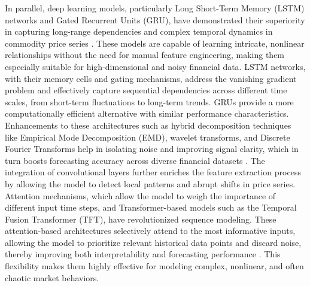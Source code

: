 \documentclass[12pt]{elsarticle}
\begin{document}
In parallel, deep learning models, particularly Long Short-Term Memory (LSTM) networks and Gated Recurrent Units (GRU), have demonstrated their superiority in capturing long-range dependencies and complex temporal dynamics in commodity price series \cite{Sezer2020,Zhao2017}. These models are capable of learning intricate, nonlinear relationships without the need for manual feature engineering, making them especially suitable for high-dimensional and noisy financial data. LSTM networks, with their memory cells and gating mechanisms, address the vanishing gradient problem and effectively capture sequential dependencies across different time scales, from short-term fluctuations to long-term trends. GRUs provide a more computationally efficient alternative with similar performance characteristics. Enhancements to these architectures such as hybrid decomposition techniques like Empirical Mode Decomposition (EMD), wavelet transforms, and Discrete Fourier Transforms help in isolating noise and improving signal clarity, which in turn boosts forecasting accuracy across diverse financial datasets \cite{Chiroma2015,Lasheras2015}. The integration of convolutional layers further enriches the feature extraction process by allowing the model to detect local patterns and abrupt shifts in price series. Attention mechanisms, which allow the model to weigh the importance of different input time steps, and Transformer-based models such as the Temporal Fusion Transformer (TFT), have revolutionized sequence modeling. These attention-based architectures selectively attend to the most informative inputs, allowing the model to prioritize relevant historical data points and discard noise, thereby improving both interpretability and forecasting performance \cite{Chen2024}. This flexibility makes them highly effective for modeling complex, nonlinear, and often chaotic market behaviors.
\end{document}
